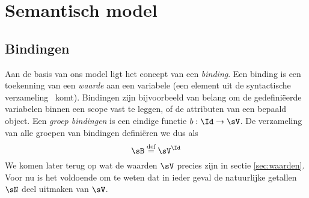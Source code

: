 \chapter{Semantisch model}

\section{Bindingen}\label{sec:bindinge}

Aan de basis van ons model ligt het concept van een \emph{binding}. Een binding is een toekenning van een \emph{waarde} aan een variabele (een element uit de syntactische verzameling \Id\ komt). Bindingen zijn bijvoorbeeld van belang om de gedefiniëerde variabelen binnen een scope vast te leggen, of de attributen van een bepaald object. Een \emph{groep bindingen} is een eindige functie $b : \Id \to \sV$. De verzameling van alle groepen van bindingen definiëren we dus als
$$ \sB \DEF \sV^\Id $$
We komen later terug op wat de waarden $\sV$ precies zijn in sectie \ref{sec:waarden}. Voor nu is het voldoende om te weten dat in ieder geval de natuurlijke getallen $\sN$ deel uitmaken van $\sV$.



